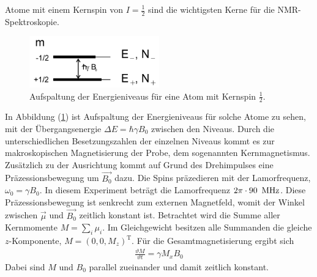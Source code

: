 Atome mit einem Kernspin von $I=\frac{1}{2}$ sind die wichtigsten Kerne für die NMR-Spektroskopie.
\begin{figure}[hbtp]
	\centering
	\includegraphics[width=0.5\textwidth]{Plots/energieniveaus.png}
	\caption{Aufspaltung der Energieniveaus f\"{u}r eine Atom mit Kernspin $\frac{1}{2}$.}
	\label{Energieniveaus}
\end{figure}
In Abbildung (\ref{Energieniveaus}) ist Aufspaltung der Energieniveaus f\"{u}r solche Atome zu sehen, mit der \"{U}bergangsenergie $\Delta E = \hbar \gamma B_0$ zwischen den Niveaus.
Durch die unterschiedlichen Besetzungszahlen der einzelnen Niveaus kommt es zur makroskopischen Magnetisierung der Probe, dem sogenannten Kernmagnetismus.
Zus\"{a}tzlich zu der Aus{\-}richt{\-}ung kommt auf Grund des Drehimpulses eine Pr\"{a}zessionsbewegung um $\overrightarrow{B_0}$ dazu.
Die Spins pr\"{a}zedieren mit der Lamorfrequenz, $\omega_0 = \gamma B_0$.
In diesem Experiment betr\"{a}gt die Lamorfrequenz $2\pi \cdot 90 \text{\, MHz}$.
Diese Pr\"{a}zessionsbewegung ist senkrecht zum externen Magnetfeld, womit der Winkel zwischen $\overrightarrow{\mu}$ und $\overrightarrow{B_0}$ zeitlich konstant ist.
Betrachtet wird die Summe aller Kernmomente $M = \sum_i \mu_i$.
Im Gleichgewicht besitzen alle Summanden die gleiche $z$-Komponente, $M = (0,0,M_z)^{\text{T}}$.
F\"{u}r die Gesamtmagnetisierung ergibt sich
\begin{align*}
	\frac{\vartheta M}{\vartheta t} = \gamma M_x B_0
\end{align*}
Dabei sind $M$ und $B_0$ parallel zueinander und damit zeitlich konstant.

